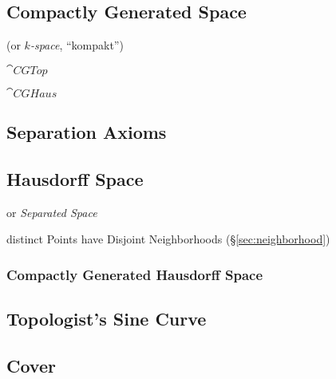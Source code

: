 \subsection{Compactly Generated Space}\label{sec:compactly_generated}

(or \emph{$k$-space}, ``kompakt'')

$\cat{CGTop}$

$\cat{CGHaus}$



\subsection{Separation Axioms}\label{sec:separation_axioms}

\subsection{Hausdorff Space}\label{sec:hausdorff_space}

or \emph{Separated Space}

distinct Points have Disjoint Neighborhoods (\S\ref{sec:neighborhood})



\subsubsection{Compactly Generated Hausdorff Space}
\label{sec:compact_hausdorff}



\subsection{Topologist's Sine Curve}\label{sec:topologists_sine}

\subsection{Cover}\label{sec:topological_cover}

